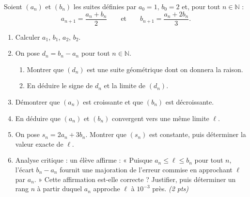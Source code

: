 \documentclass[11pt]{article}
\begin{document}
\begin{exercice}
Soient $(a_n)$ et $(b_n)$ les suites définies par $a_0 = 1$, $b_0 = 2$ et, pour tout $n \in \mathbb{N}$ :
\[ a_{n+1} = \frac{a_n + b_n}{2} \qquad \text{et} \qquad b_{n+1} = \frac{a_n + 2b_n}{3}. \]
\begin{enumerate}
\item Calculer $a_1$, $b_1$, $a_2$, $b_2$.
\item On pose $d_n = b_n - a_n$ pour tout $n \in \mathbb{N}$.
\begin{enumerate}
\item Montrer que $(d_n)$ est une suite géométrique dont on donnera la raison.
\item En déduire le signe de $d_n$ et la limite de $(d_n)$.
\end{enumerate}
\item Démontrer que $(a_n)$ est croissante et que $(b_n)$ est décroissante.
\item En déduire que $(a_n)$ et $(b_n)$ convergent vers une même limite $\ell$.
\item On pose $s_n = 2a_n + 3b_n$. Montrer que $(s_n)$ est constante, puis déterminer la valeur exacte de $\ell$.
\item Analyse critique : un élève affirme : « Puisque $a_n \leq \ell \leq b_n$ pour tout $n$, l'écart $b_n - a_n$ fournit une majoration de l'erreur commise en approchant $\ell$ par $a_n$. » Cette affirmation est-elle correcte ? Justifier, puis déterminer un rang $n$ à partir duquel $a_n$ approche $\ell$ à $10^{-3}$ près. \emph{(2 pts)}
\end{enumerate}
\end{exercice}
\end{document}
